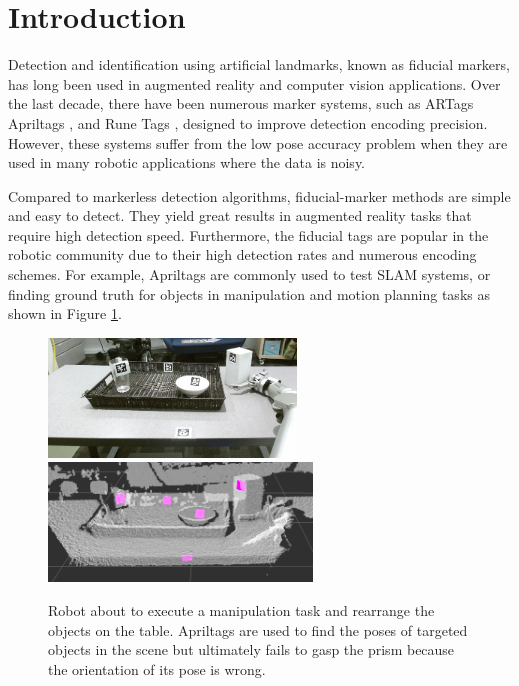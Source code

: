 \section{Introduction}
\label{sec:intro}

Detection and identification using artificial landmarks, known as fiducial markers, has long been used in augmented reality and computer vision applications. Over the last decade, there have been numerous marker systems, such as ARTags \citep{fiala2004artag} Apriltags \citep{olson2011apriltag}, and Rune Tags \citep{bergamasco2011rune}, designed to improve detection encoding precision. However, these systems suffer from the low pose accuracy problem when they are used in many robotic applications where the data is noisy.

Compared to markerless detection algorithms, fiducial-marker methods are simple and easy to detect. They yield great results in augmented reality tasks that require high detection speed. Furthermore, the fiducial tags are popular in the robotic community due to their high detection rates and numerous encoding schemes. For example, Apriltags are commonly used to test SLAM systems, or finding ground truth for objects in manipulation and motion planning tasks as shown in Figure \ref{fig:table_clearing}. 

\begin{figure}
\includegraphics[width=\columnwidth, height=120px]{figs/table_clearing_rgb_small} \\
\includegraphics[width=\columnwidth, height=120px]{figs/table_clearing_depth}
\caption{Robot about to execute a manipulation task and rearrange the objects on the table. Apriltags are used to find the poses of targeted objects in the scene but ultimately fails to gasp the prism because the orientation of its pose is wrong.}
\label{fig:table_clearing}
\end{figure}

